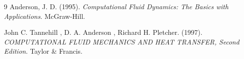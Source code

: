 \documentclass[12pt]{article}
\begin{document}
\begin{thebibliography}{9}%
Anderson, J. D.%
(1995).%
\textit{Computational Fluid Dynamics: The Basics with Applications}.%
McGraw-Hill.%

John C. Tannehill , D. A. Anderson , Richard H. Pletcher.%
(1997).%
\textit{COMPUTATIONAL FLUID
MECHANICS AND HEAT TRANSFER, Second Edition}.%
Taylor \& Francis.%
\end{thebibliography}
\end{document}
